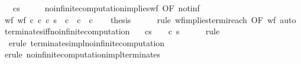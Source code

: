 \begin{isabellebody}
\ \ \ {\isachardoublequoteopen}{\isasymGamma}{\isasymturnstile}c{\isasymdown}s{\isachardoublequoteclose}\isanewline
%
\isadelimproof
%
\endisadelimproof
%
\isatagproof
{}\isamarkupfalse%
\ {\isacharminus}\isanewline
\ \ \isamarkupfalse%
\ no{\isacharunderscore}infinite{\isacharunderscore}computation{\isacharunderscore}implies{\isacharunderscore}wf\ {\isacharbrackleft}OF\ not{\isacharunderscore}inf{\isacharbrackright}\isanewline
\ \ \isamarkupfalse%
\ wf{\isacharcolon}\ {\isachardoublequoteopen}wf\ {\isacharbraceleft}{\isacharparenleft}c{}{\isacharcomma}\ c{}{\isacharparenright}{\isachardot}\ {\isasymGamma}{\isasymturnstile}{\isacharparenleft}c{\isacharcomma}\ s{\isacharparenright}\ {\isasymrightarrow}\isactrlsup {\isacharasterisk}\ c{}\ {\isasymand}\ {\isasymGamma}{\isasymturnstile}c{}\ {\isasymrightarrow}\ c{}{\isacharbraceright}{\isachardoublequoteclose}\isacommand{{\isachardot}}\isamarkupfalse%
\isanewline
\ \ \isamarkupfalse%
\ {\isacharquery}thesis\isanewline
\ \ \ \ \isamarkupfalse%
\ {\isacharparenleft}rule\ wf{\isacharunderscore}implies{\isacharunderscore}termi{\isacharunderscore}reach\ {\isacharbrackleft}OF\ wf{\isacharbrackright}{\isacharparenright}\ auto\isanewline
{}\isamarkupfalse%
%
\endisatagproof
{\isafoldproof}%
%
\isadelimproof
\isanewline
%
\endisadelimproof
\isanewline
{}\isamarkupfalse%
\ terminates{\isacharunderscore}iff{\isacharunderscore}no{\isacharunderscore}infinite{\isacharunderscore}computation{\isacharcolon}\ \isanewline
\ \ {\isachardoublequoteopen}{\isasymGamma}{\isasymturnstile}c{\isasymdown}s\ {\isacharequal}\ {\isacharparenleft}{\isasymnot}\ {\isasymGamma}{\isasymturnstile}\ {\isacharparenleft}c{\isacharcomma}\ s{\isacharparenright}\ {\isasymrightarrow}\ {\isasymdots}{\isacharparenleft}{\isasyminfinity}{\isacharparenright}{\isacharparenright}{\isachardoublequoteclose}\isanewline
%
\isadelimproof
\ \ %
\endisadelimproof
%
\isatagproof
{}\isamarkupfalse%
\ {\isacharparenleft}rule{\isacharparenright}\isanewline
\ \ \isamarkupfalse%
\ \ {\isacharparenleft}erule\ terminates{\isacharunderscore}impl{\isacharunderscore}no{\isacharunderscore}infinite{\isacharunderscore}computation{\isacharparenright}\isanewline
\ \ \isamarkupfalse%
\ {\isacharparenleft}erule\ no{\isacharunderscore}infinite{\isacharunderscore}computation{\isacharunderscore}impl{\isacharunderscore}terminates{\isacharparenright}\isanewline

\end{isabellebody}
